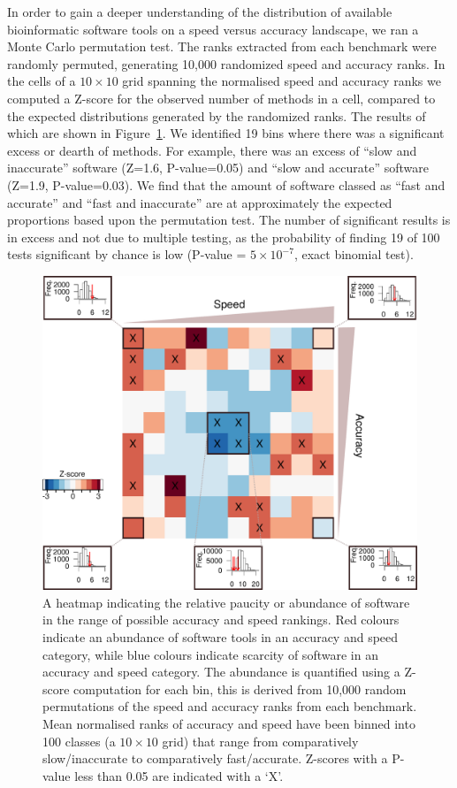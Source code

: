 \documentclass[fleqn,10pt]{SelfArx} %
\begin{document}
In order to gain a deeper understanding of the distribution of available bioinformatic software tools on a speed versus accuracy landscape, we ran a Monte Carlo permutation test. The ranks extracted from each benchmark were randomly permuted, generating 10,000 randomized speed and accuracy ranks. In the cells of a $10\times10$ grid spanning the normalised speed and accuracy ranks we computed a Z-score for the observed number of methods in a cell, compared to the expected distributions generated by the randomized ranks. The results of which are shown in Figure~\ref{fig:speedaccuracy}. We identified 19 bins where there was a significant excess or dearth of methods. For example, there was an excess of “slow and inaccurate” software (Z=1.6, P-value=0.05) and “slow and accurate” software (Z=1.9, P-value=0.03). We find that the amount of software classed as “fast and accurate” and “fast and inaccurate” are at approximately the expected proportions based upon the permutation test. The number of significant results is in excess and not due to multiple testing, as the probability of finding 19 of 100 tests significant by chance is low (P-value = $5\times 10^{-7}$, exact binomial test).


\begin{figure}
\includegraphics[width=\textwidth]{figure2.pdf}
\caption{A heatmap indicating the relative paucity or abundance of software in the range of possible accuracy and speed rankings. Red colours indicate an abundance of software tools in an accuracy and speed category, while blue colours indicate scarcity of software in an accuracy and speed category. The abundance is quantified using a Z-score computation for each bin, this is derived from 10,000 random permutations of the speed and accuracy ranks from each benchmark. Mean normalised ranks of accuracy and speed have been binned into 100 classes (a $10\times10$ grid) that range from comparatively slow/inaccurate to comparatively fast/accurate. Z-scores with a P-value less than 0.05 are indicated with a ‘X’.}
\label{fig:speedaccuracy}
\end{figure}
\end{document}
